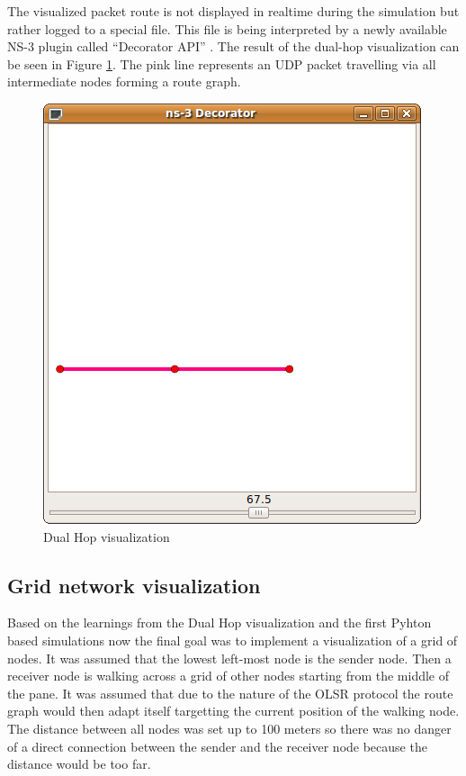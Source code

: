 The visualized packet route is not displayed in realtime during the
simulation but rather logged to a special file. This file is being
interpreted by a newly available NS-3 plugin called {}``Decorator
API'' . The result of the dual-hop visualization can be seen in
Figure \ref{fig:Dual-Hop-visualization}. The pink line represents
an UDP packet travelling via all intermediate nodes forming a route
graph.

%
\begin{figure}
\begin{centering}
\includegraphics[scale=0.5]{src/results/dualhop_visualization}
\par\end{centering}

\caption{\label{fig:Dual-Hop-visualization}Dual Hop visualization}



\end{figure}



\subsection{Grid network visualization}

Based on the learnings from the Dual Hop visualization and the first
Pyhton based simulations now the final goal was to implement a visualization
of a grid of nodes. It was assumed that the lowest left-most node
is the sender node. Then a receiver node is walking across a grid
of other nodes starting from the middle of the pane. It was assumed
that due to the nature of the OLSR protocol the route graph would
then adapt itself targetting the current position of the walking node.
The distance between all nodes was set up to 100 meters so there was
no danger of a direct connection between the sender and the receiver
node because the distance would be too far.

